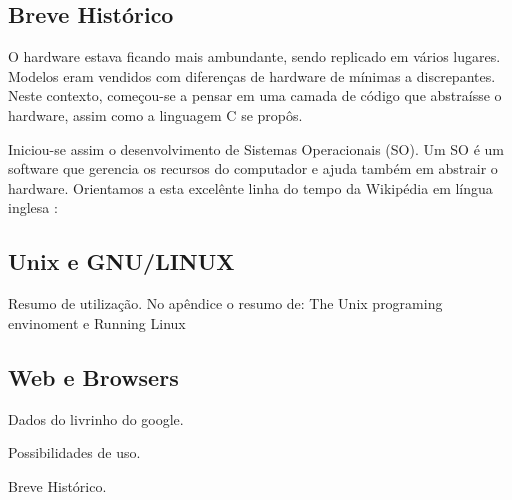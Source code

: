 \subsection{Breve Histórico}

O hardware estava ficando mais ambundante, sendo replicado em 
vários lugares. Modelos eram vendidos com diferenças de hardware 
de mínimas a discrepantes. Neste contexto, começou-se a
pensar em uma camada de código que abstraísse o hardware, assim
como a linguagem C se propôs.

Iniciou-se assim o desenvolvimento de Sistemas Operacionais (SO).
Um SO é um software que gerencia os recursos do computador e ajuda
também em abstrair o hardware. Orientamos a esta excelênte linha do
tempo da Wikipédia em língua inglesa \cite{solinhadotempo}:



\subsection{Unix e GNU/LINUX}

Resumo de utilização. No apêndice o resumo de:
The Unix programing envinoment
e
Running Linux

\subsection{Web e Browsers}

Dados do livrinho do google.

Possibilidades de uso.

Breve Histórico.




